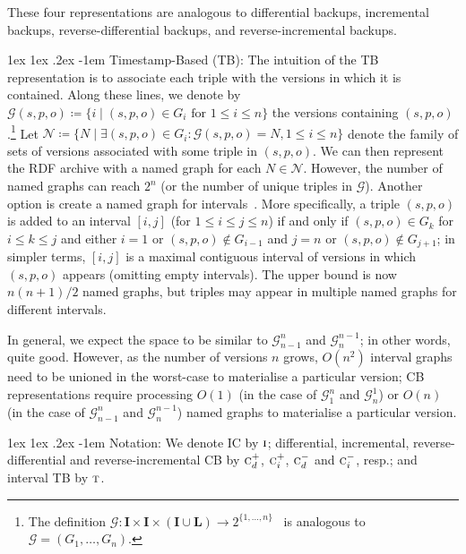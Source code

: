 \documentclass{llncs}
\makeatletter
\renewcommand\paragraph{\@startsection{paragraph}{4}{\z@}%
	{1ex \@plus1ex \@minus.2ex}%
	{-1em}%
	{\normalfont\normalsize\itshape}}
\newcommand{\I}{\ensuremath{\mathbf{I}}\xspace}
\renewcommand{\L}{\ensuremath{\mathbf{L}}\xspace}
\makeatother
\begin{document}
These four representations are analogous to differential backups, incremental backups, reverse-differential backups, and reverse-incremental backups.

\paragraph{Timestamp-Based (TB):} The intuition of the TB representation is to associate each triple with the versions in which it is contained. Along these lines, we denote by $\mathcal{G}(s,p,o) \coloneqq \{ i \mid (s,p,o) \in G_i\text{ for } 1 \leq i \leq n \}$ the versions containing $(s,p,o)$.\footnote{The definition $\mathcal{G} : \I \times \I \times (\I \cup \L) \rightarrow 2^{\{1,\ldots,n\}}$~\cite{FernandezUPK19} is analogous to $\mathcal{G} = (G_1,\ldots,G_n)$.} Let $\mathcal{N} \coloneqq \{ N \mid \exists (s,p,o) \in G_i : \mathcal{G}(s,p,o) = N, 1 \leq i \leq n  \}$ denote the family of sets of versions associated with some triple in $(s,p,o)$. We can then represent the RDF archive with a named graph for each $N \in \mathcal{N}$. However, the number of named graphs can reach $2^n$ (or the number of unique triples in $\mathcal{G}$). Another option is create a named graph for intervals~\cite{FernandezPU15}. More specifically, a triple $(s,p,o)$ is added to an interval $[i,j]$ (for $1 \leq i \leq j \leq n$) if and only if $(s,p,o) \in G_k$ for $i \leq k \leq j$ and either $i = 1$ or $(s,p,o) \notin G_{i-1}$ and $j = n$ or $(s,p,o) \notin G_{j+1}$; in simpler terms, $[i,j]$ is a maximal contiguous interval of versions in which $(s,p,o)$ appears (omitting empty intervals). The upper bound is now $n(n+1)/2$ named graphs, but triples may appear in multiple named graphs for different intervals.

In general, we expect the space to be similar to $\mathcal{G}^n_{n-1}$ and $\mathcal{G}^{n-1}_n$; in other words, quite good. However, as the number of versions $n$ grows, $O(n^2)$ interval graphs need to be unioned in the worst-case to materialise a particular version; CB representations require processing $O(1)$ (in the case of $\mathcal{G}^n_1$ and $\mathcal{G}^1_n$) or $O(n)$ (in the case of $\mathcal{G}^n_{n-1}$ and $\mathcal{G}^{n-1}_n$) named graphs to materialise a particular version. 

\paragraph{Notation:} We denote IC by $\textsc{i}$; differential, incremental, reverse-differential and reverse-incremental CB by $\textsc{c}_d^{+}$, $\textsc{c}_i^{+}$, $\textsc{c}_d^{-}$ and $\textsc{c}_i^{-}$, resp.; and interval TB by $\textsc{t}$.
\end{document}
